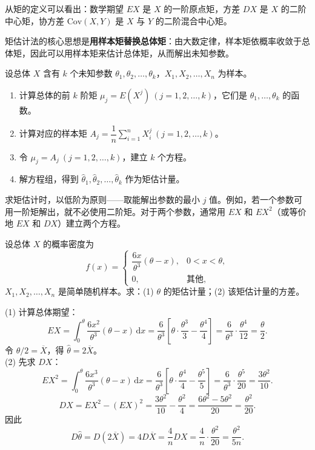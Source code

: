 ﻿\documentclass[lang=cn,11pt]{elegantbook}
\begin{document}
\begin{note}
从矩的定义可以看出：数学期望 \(EX\) 是 \(X\) 的一阶原点矩，方差 \(DX\) 是 \(X\) 的二阶中心矩，协方差 \(\mathrm{Cov}(X,Y)\) 是 \(X\) 与 \(Y\) 的二阶混合中心矩。
\end{note}

矩估计法的核心思想是\textbf{用样本矩替换总体矩}：由大数定律，样本矩依概率收敛于总体矩，因此可以用样本矩来估计总体矩，从而解出未知参数。

\begin{property}[矩估计的步骤] \label{prop:mme-steps}
设总体 \(X\) 含有 \(k\) 个未知参数 \(\theta_1, \theta_2, \dots, \theta_k\)，\(X_1, X_2, \dots, X_n\) 为样本。
\begin{enumerate}
    \item 计算总体的前 \(k\) 阶矩 \(\mu_j = E(X^j)\ (j=1,2,\dots,k)\)，它们是 \(\theta_1, \dots, \theta_k\) 的函数。
    \item 计算对应的样本矩 \(A_j = \dfrac{1}{n}\displaystyle\sum_{i=1}^{n}X_i^j\ (j=1,2,\dots,k)\)。
    \item 令 \(\mu_j = A_j\ (j=1,2,\dots,k)\)，建立 \(k\) 个方程。
    \item 解方程组，得到 \(\hat{\theta}_1, \hat{\theta}_2, \dots, \hat{\theta}_k\) 作为矩估计量。
\end{enumerate}
\end{property}

\begin{note}
求矩估计时，以低阶为原则——取能解出参数的最小 \(j\) 值。例如，若一个参数可用一阶矩解出，就不必使用二阶矩。对于两个参数，通常用 \(EX\) 和 \(EX^2\)（或等价地 \(EX\) 和 \(DX\)）建立两个方程。
\end{note}

\begin{exercise}[矩估计量的方差] \label{ex:mom_03}
设总体 \(X\) 的概率密度为
\[
f(x)=
\begin{cases}
\dfrac{6x}{\theta^3}(\theta-x), & 0<x<\theta,\\
0, & \text{其他},
\end{cases}
\]
\(X_1,X_2,\dots,X_n\) 是简单随机样本。求：(1) \(\theta\) 的矩估计量；(2) 该矩估计量的方差。
\end{exercise}
\begin{solution}
(1) 计算总体期望：
\[
EX=\int_0^\theta\frac{6x^2}{\theta^3}(\theta-x)\,\mathrm{d}x=\frac{6}{\theta^3}\!\left[\theta\cdot\frac{\theta^3}{3}-\frac{\theta^4}{4}\right]=\frac{6}{\theta^3}\cdot\frac{\theta^4}{12}=\frac{\theta}{2}.
\]
令 \(\theta/2=\overline{X}\)，得 \(\hat{\theta}=2\overline{X}\)。\\
(2) 先求 \(DX\)：
\[
EX^2=\int_0^\theta\frac{6x^3}{\theta^3}(\theta-x)\,\mathrm{d}x=\frac{6}{\theta^3}\!\left[\theta\cdot\frac{\theta^4}{4}-\frac{\theta^5}{5}\right]=\frac{6}{\theta^3}\cdot\frac{\theta^5}{20}=\frac{3\theta^2}{10}.
\]
\[
DX=EX^2-(EX)^2=\frac{3\theta^2}{10}-\frac{\theta^2}{4}=\frac{6\theta^2-5\theta^2}{20}=\frac{\theta^2}{20}.
\]
因此
\[
D\hat{\theta}=D(2\overline{X})=4D\overline{X}=\frac{4}{n}DX=\frac{4}{n}\cdot\frac{\theta^2}{20}=\frac{\theta^2}{5n}.
\]
\end{solution}
\end{document}
